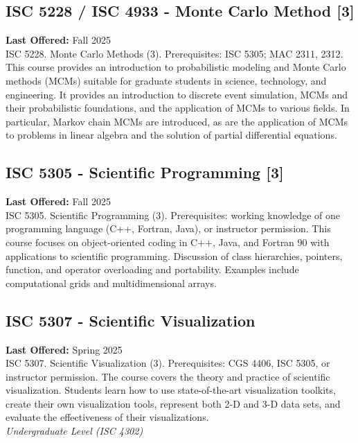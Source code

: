 \documentclass[12pt,a4paper]{article}
\begin{document}
\subsection{ISC 5228 / ISC 4933 - Monte Carlo Method [3]}
\textbf{Last Offered:} Fall 2025 \\
ISC 5228. Monte Carlo Methods (3). Prerequisites: ISC 5305; MAC 2311, 2312. This course provides an introduction to probabilistic modeling and Monte Carlo methods (MCMs) suitable for graduate students in science, technology, and engineering. It provides an introduction to discrete event simulation, MCMs and their probabilistic foundations, and the application of MCMs to various fields. In particular, Markov chain MCMs are introduced, as are the application of MCMs to problems in linear algebra and the solution of partial differential equations.

\subsection{ISC 5305 - Scientific Programming [3]}
\textbf{Last Offered:} Fall 2025 \\
ISC 5305. Scientific Programming (3). Prerequisites: working knowledge of one programming language (C++, Fortran, Java), or instructor permission. This course focuses on object-oriented coding in C++, Java, and Fortran 90 with applications to scientific programming. Discussion of class hierarchies, pointers, function, and operator overloading and portability. Examples include computational grids and multidimensional arrays.

\subsection{ISC 5307 - Scientific Visualization}
\textbf{Last Offered:} Spring 2025 \\
ISC 5307. Scientific Visualization (3). Prerequisites: CGS 4406, ISC 5305, or instructor permission. The course covers the theory and practice of scientific visualization. Students learn how to use state-of-the-art visualization toolkits, create their own visualization tools, represent both 2-D and 3-D data sets, and evaluate the effectiveness of their visualizations. \\
\textit{Undergraduate Level (ISC 4302)}
\end{document}
